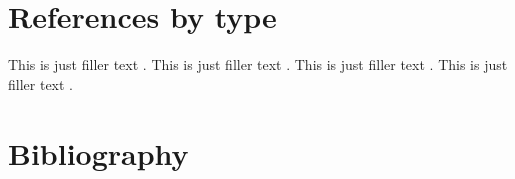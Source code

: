\documentclass[a4paper,oneside]{book}
\begin{document}
\chapter{References by type}

This is just filler text \parencite{knuth:ct:a}.
This is just filler text \parencite{ctan}.
This is just filler text \parencite{companion}.
This is just filler text \parencite{markey}.

\chapter*{Bibliography}
\printbibliography[heading=printed,nottype=online]
\printbibliography[heading=online,type=online]
\end{document}
